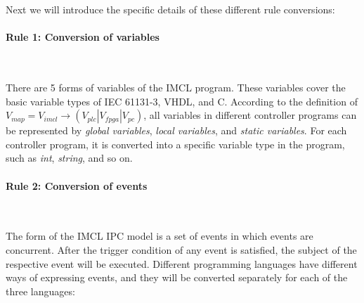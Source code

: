 Next we will introduce the specific details of these different rule conversions:


\paragraph{\textbf{Rule 1: Conversion of variables}} \

There are 5 forms of variables of the IMCL program. These variables cover the basic variable types of IEC 61131-3, VHDL, and C. According to the definition of$V_{map} = V_{imcl} \rightarrow (V_{plc} | V_{fpga}| V_{pc})$, all variables in different controller programs can be represented by \emph{global variables}, \emph{local variables}, and \emph{static variables}. For each controller program, it is converted into a specific variable type in the program, such as \emph{int}, \emph{string}, and so on.

\paragraph{\textbf{Rule 2: Conversion of events}} \

The form of the IMCL IPC model is a set of events in which events are concurrent. After the trigger condition of any event is satisfied, the subject of the respective event will be executed. Different programming languages have different ways of expressing events, and they will be converted separately for each of the three languages:

